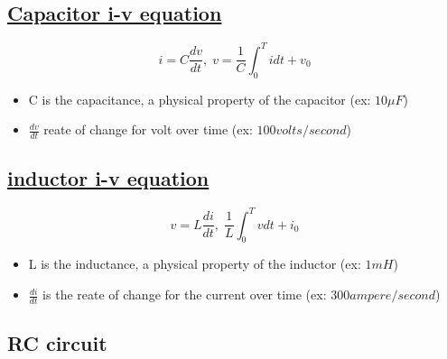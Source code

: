\subsection{\href{https://www.khanacademy.org/science/electrical-engineering/ee-circuit-analysis-topic/ee-natural-and-forced-response/a/ee-capacitor-equation-in-action}{Capacitor i-v equation}}
\begin{equation}
  i=C\frac{dv}{dt}, \; v=\frac{1}{C}\int^T_0 idt + v_0 
\end{equation}
\begin{itemize}
    \item C is the capacitance, a physical property of the capacitor (ex: $10\mu F$)
    \item $\frac{dv}{dt}$ reate of change for volt over time (ex: $100 volts/second$)
\end{itemize}

\subsection{\href{https://www.khanacademy.org/science/electrical-engineering/ee-circuit-analysis-topic/ee-natural-and-forced-response/a/wmc-inductor-in-action}{inductor i-v equation}}
\begin{equation}
  v=L\frac{di}{dt}, \; \frac{1}{L}\int^T_0 vdt + i_0
\end{equation}
\begin{itemize}
    \item L is the inductance, a physical property of the inductor (ex: $1mH$)
    \item $\frac{di}{dt}$ is the reate of change for the current over time (ex: $300 ampere/second$)
\end{itemize}

\newpage
\subsection{RC circuit}
